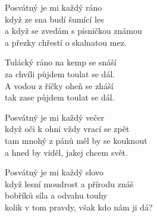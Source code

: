 
\ve{}
Posvátný je mi každý ráno\\
když ze sna budí šumící les\\
a když se zvedám s písničkou známou\\
a přezky chřestí o skalnatou mez.

\cho{}
Tulácký ráno na kemp se snáší\\
za chvíli půjdem toulat se dál.\\
A vodou z říčky oheň se zháší\\
tak zase půjdem toulat se dál.

\ve{}
Posvátný je mi každý večer\\
když oči k ohni vždy vrací se zpět\\
tam mnohý z pánů měl by se kouknout\\
a hned by viděl, jakej chcem svět.

\cho{}

\ve{}
Posvátný je mi každý slovo\\
když lesní moudrost a přírodu znáš\\
bobříků síla a odvahu touhy\\
kolik v tom pravdy, však kdo nám ji dá?

\cho{}

\esong